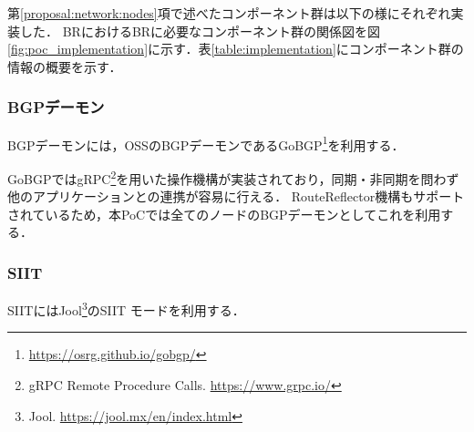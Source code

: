 \begin{table}[h]
    \label{table:implementation}
    \caption{PoCの実装に利用したソフトウェア群}
\end{table}

第\ref{proposal:network:nodes}項で述べたコンポーネント群は以下の様にそれぞれ実装した．
BRにおけるBRに必要なコンポーネント群の関係図を図\ref{fig:poc_implementation}に示す．表\ref{table:implementation}にコンポーネント群の情報の概要を示す．


\subsubsection{BGPデーモン}
BGPデーモンには，OSSのBGPデーモンであるGoBGP\footnote{\url{https://osrg.github.io/gobgp/}}を利用する．

GoBGPではgRPC\footnote{gRPC Remote Procedure Calls. \url{https://www.grpc.io/}}を用いた操作機構が実装されており，同期・非同期を問わず他のアプリケーションとの連携が容易に行える．
RouteReflector機構もサポートされているため，本PoCでは全てのノードのBGPデーモンとしてこれを利用する．

\subsubsection{SIIT}
SIITにはJool\footnote{Jool. \url{https://jool.mx/en/index.html}}のSIIT モードを利用する．

